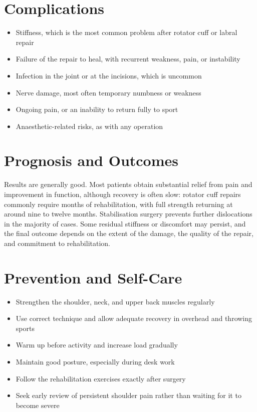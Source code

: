 \section*{Complications}
\begin{itemize}
    \item Stiffness, which is the most common problem after rotator cuff or labral repair
    \item Failure of the repair to heal, with recurrent weakness, pain, or instability
    \item Infection in the joint or at the incisions, which is uncommon
    \item Nerve damage, most often temporary numbness or weakness
    \item Ongoing pain, or an inability to return fully to sport
    \item Anaesthetic-related risks, as with any operation
\end{itemize}

\section*{Prognosis and Outcomes}
Results are generally good. Most patients obtain substantial relief from pain and improvement in function, although recovery is often slow: rotator cuff repairs commonly require months of rehabilitation, with full strength returning at around nine to twelve months. Stabilisation surgery prevents further dislocations in the majority of cases. Some residual stiffness or discomfort may persist, and the final outcome depends on the extent of the damage, the quality of the repair, and commitment to rehabilitation.

\section*{Prevention and Self-Care}
\begin{itemize}
    \item Strengthen the shoulder, neck, and upper back muscles regularly
    \item Use correct technique and allow adequate recovery in overhead and throwing sports
    \item Warm up before activity and increase load gradually
    \item Maintain good posture, especially during desk work
    \item Follow the rehabilitation exercises exactly after surgery
    \item Seek early review of persistent shoulder pain rather than waiting for it to become severe
\end{itemize}

